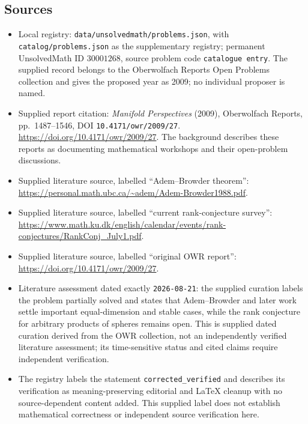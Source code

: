 \documentclass[11pt]{article}
\begin{document}
\subsection{Sources}
\begin{itemize}
\item Local registry: \texttt{data/unsolvedmath/problems.json}, with \texttt{catalog/problems.json} as the supplementary registry; permanent UnsolvedMath ID \(30001268\), source problem code \texttt{catalogue entry}. The supplied record belongs to the Oberwolfach Reports Open Problems collection and gives the proposed year as 2009; no individual proposer is named.
\item Supplied report citation: \emph{Manifold Perspectives} (2009), Oberwolfach Reports, pp.~1487--1546, DOI \texttt{10.4171/owr/2009/27}. \url{https://doi.org/10.4171/owr/2009/27}. The background describes these reports as documenting mathematical workshops and their open-problem discussions.
\item Supplied literature source, labelled ``Adem--Browder theorem'': \url{https://personal.math.ubc.ca/~adem/Adem-Browder1988.pdf}.
\item Supplied literature source, labelled ``current rank-conjecture survey'': \url{https://www.math.ku.dk/english/calendar/events/rank-conjectures/RankConj_July1.pdf}.
\item Supplied literature source, labelled ``original OWR report'': \url{https://doi.org/10.4171/owr/2009/27}.
\item Literature assessment dated exactly \texttt{2026-08-21}: the supplied curation labels the problem partially solved and states that Adem--Browder and later work settle important equal-dimension and stable cases, while the rank conjecture for arbitrary products of spheres remains open. This is supplied dated curation derived from the OWR collection, not an independently verified literature assessment; its time-sensitive status and cited claims require independent verification.
\item The registry labels the statement \texttt{corrected\_verified} and describes its verification as meaning-preserving editorial and LaTeX cleanup with no source-dependent content added. This supplied label does not establish mathematical correctness or independent source verification here.
\end{itemize}
\end{document}
